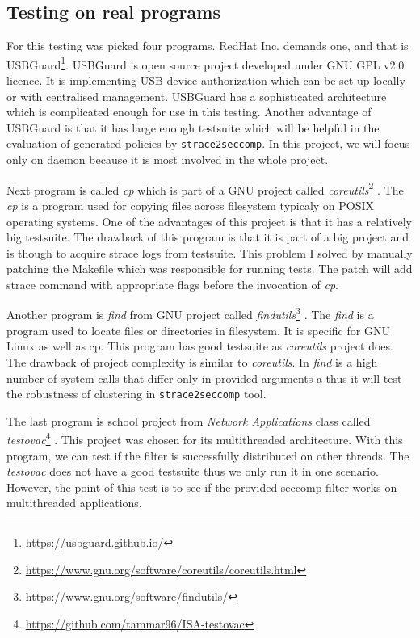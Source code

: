 \subsection{Testing on real programs}
For this testing was picked four programs. RedHat Inc. demands one, and that is
USBGuard\footnote{\url{https://usbguard.github.io/}}. USBGuard is open source
project developed under GNU GPL v2.0 licence. It is implementing USB device
authorization which can be set up locally or with centralised
management\cite{usbguardCentralized}. USBGuard has a sophisticated architecture
which is complicated enough for use in this testing. Another advantage of
USBGuard is that it has large enough testsuite which will be helpful in the
evaluation of generated policies by \texttt{strace2seccomp}. In this project, we
will focus only on daemon because it is most involved in the whole project.

Next program is called \emph{cp} which is part of a GNU project called
\emph{coreutils}\footnote{\url{https://www.gnu.org/software/coreutils/coreutils.html}} .
The \emph{cp} is a program used for copying files across filesystem typicaly on
POSIX operating systems. One of the advantages of this project is that it has a
relatively big testsuite. The drawback of this program is that it is part of a
big project and is though to acquire strace logs from testsuite. This problem I
solved by manually patching the Makefile which was responsible for running
tests. The patch will add strace command with appropriate flags before the
invocation of \emph{cp}.

Another program is \emph{find} from GNU project called
\emph{findutils}\footnote{\url{https://www.gnu.org/software/findutils/}} . The
\emph{find} is a program used to locate files or directories in filesystem. It
is specific for GNU Linux as well as cp. This program has good testsuite as
\emph{coreutils} project does. The drawback of project complexity is similar to
\emph{coreutils}. In \emph{find} is a high number of system calls that differ
only in provided arguments a thus it will test the robustness of clustering in
\texttt{strace2seccomp} tool.

The last program is school project from \emph{Network Applications} class called
\emph{testovac}\footnote{\url{https://github.com/tammar96/ISA-testovac}} . This
project was chosen for its multithreaded architecture. With this program, we can
test if the filter is successfully distributed on other threads. The
\emph{testovac} does not have a good testsuite thus we only run it in one
scenario. However, the point of this test is to see if the provided seccomp
filter works on multithreaded applications.

